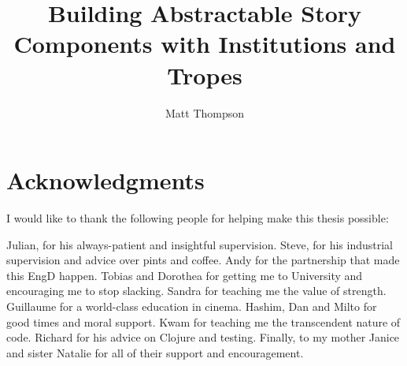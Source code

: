 \documentclass[11pt]{report}
\title{Building Abstractable Story Components with Institutions and Tropes}
\author{Matt Thompson}
\newif\ifdraft
\begin{document}
\maketitle

\ifdraft
\clearpage
\listoftodos[List of Corrections]
\clearpage
\fi

\clearpage
\tableofcontents
\clearpage

\chapter*{Acknowledgments}
I would like to thank the following people for helping make this thesis
possible:

Julian, for his always-patient and insightful supervision. Steve, for his
industrial supervision and advice over pints and coffee. Andy for the
partnership that made this EngD happen. Tobias and Dorothea for
getting me to University and encouraging me to stop slacking. Sandra for
teaching me the value of strength. Guillaume for a world-class education in
cinema. Hashim, Dan and Milto for good times and moral support. Kwam for teaching me
the transcendent nature of code. Richard for his advice on Clojure and
testing. Finally, to my mother Janice and sister Natalie for all of their
support and encouragement.




\end{document}
